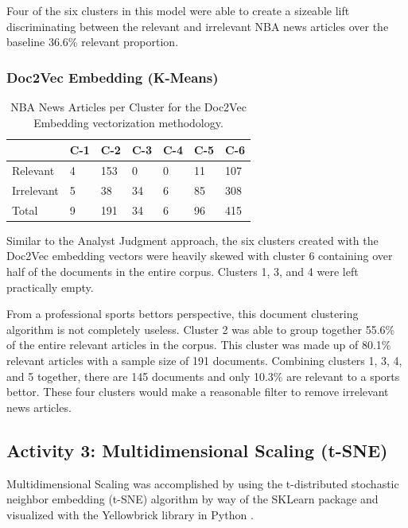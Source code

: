 \documentclass[5p,authoryear]{elsarticle}
\begin{document}
Four of the six clusters in this model were able to create a sizeable lift discriminating between the relevant and irrelevant NBA news articles over the baseline 36.6\% relevant proportion. 


\subsubsection{Doc2Vec Embedding (K-Means)}\label{doc2}

\begin{table}[!htb] 
  \centering 
  \begin{tabular}{@{\small}lllllll@{}} 
    \toprule %
    & {\footnotesize C-1} &  {\footnotesize C-2} & {\footnotesize  C-3} & {\footnotesize  C-4} & {\footnotesize  C-5} & {\footnotesize  C-6} \\ \midrule
    Relevant & 4 & 153 & 0 & 0 & 11 & 107 \\
    Irrelevant & 5 & 38 & 34 & 6 & 85 & 308 \\
    Total & 9 & 191 & 34 & 6 & 96 & 415 \\
    \bottomrule
\end{tabular} \caption{NBA News Articles per Cluster for the Doc2Vec Embedding vectorization methodology.} \label{table_eval}
\end{table}

Similar to the Analyst Judgment approach, the six clusters created with the Doc2Vec embedding vectors were heavily skewed with cluster 6 containing over half of the documents in the entire corpus. 
Clusters 1, 3, and 4 were left practically empty.

From a professional sports bettors perspective, this document clustering algorithm is not completely useless. 
Cluster 2 was able to group together 55.6\% of the entire relevant articles in the corpus. 
This cluster was made up of 80.1\% relevant articles with a sample size of 191 documents. 
Combining clusters 1, 3, 4, and 5 together, there are 145 documents and only 10.3\% are relevant to a sports bettor. 
These four clusters would make a reasonable filter to remove irrelevant news articles.

\subsection{Activity 3: Multidimensional Scaling (t-SNE)}\label{three}

Multidimensional Scaling was accomplished by using the t-distributed stochastic neighbor embedding (t-SNE) algorithm by way of the SKLearn package \citep{skTSNE} and visualized with the Yellowbrick library in Python \citep{Yellowbrick}.  
\end{document}
